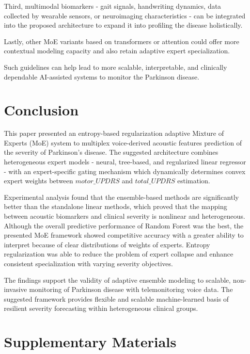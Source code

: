 \documentclass{customIEEEsingle}
\begin{document}
	Third, multimodal biomarkers - gait signals, handwriting dynamics, data collected by wearable sensors, or neuroimaging characteristics - can be integrated into the proposed architecture to expand it into profiling the disease holistically.
	
	Lastly, other MoE variants based on transformers or attention could offer more contextual modeling capacity and also retain adaptive expert specialization.
	
	Such guidelines can help lead to more scalable, interpretable, and clinically dependable AI-assisted systems to monitor the Parkinson disease.
	
	\section{Conclusion}\label{sec:conclusion}
	
	This paper presented an entropy-based regularization adaptive Mixture of Experts (MoE) system to multiplex voice-derived acoustic features prediction of the severity of Parkinson’s disease. The suggested architecture combines heterogeneous expert models - neural, tree-based, and regularized linear regressor - with an expert-specific gating mechanism which dynamically determines convex expert weights between $motor\_UPDRS$ and $total\_UPDRS$ estimation.
	
	Experimental analysis found that the ensemble-based methods are significantly better than the standalone linear methods, which proved that the mapping between acoustic biomarkers and clinical severity is nonlinear and heterogeneous. Although the overall predictive performance of Random Forest was the best, the presented MoE framework showed competitive accuracy with a greater ability to interpret because of clear distributions of weights of experts. Entropy regularization was able to reduce the problem of expert collapse and enhance consistent specialization with varying severity objectives.
	
	The findings support the validity of adaptive ensemble modeling to scalable, non-invasive monitoring of Parkinson disease with telemonitoring voice data. The suggested framework provides flexible and scalable machine-learned basis of resilient severity forecasting within heterogeneous clinical groups.
	
	\section*{Supplementary Materials} \label{sec:supplementary} 
\end{document}
